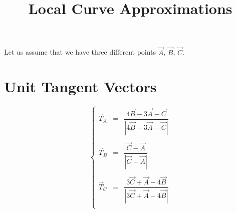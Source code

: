 \documentclass[aps,10pt]{revtex4}
\newcommand{\mynorm}[1]{\left\vert#1\right\vert}
\newcommand{\myunit}[1]{\dfrac{{#1}}{\mynorm{{#1}}}}
\begin{document}
\title{Local Curve Approximations}
\maketitle


Let us assume that we have three different points $\vec{A}$, $\vec{B}$, $\vec{C}$.

\section{Unit Tangent Vectors}

\begin{equation}
\left\lbrace
\begin{array}{rcl}
	\vec{T}_A & = & \myunit{4\vec{B}-3\vec{A}-\vec{C}}\\
	\\
	\vec{T}_B & = & \myunit{\vec{C}-\vec{A}}  \\
	\\
	\vec{T}_C & = & \myunit{3\vec{C}+\vec{A}-4\vec{B}}\\
\end{array}
\right.
\end{equation}
\end{document}
